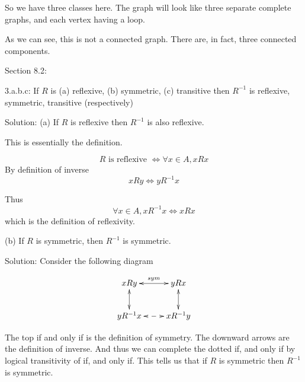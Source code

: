 \documentclass[16 pt]{amsart}
\theoremstyle{definition}
\theoremstyle{remark}
\numberwithin{equation}{section}
\begin{document}
So we have three classes here.  The graph will look like three separate complete graphs, and each vertex having a loop.

\vspace{.5in}


As we can see, this is not a connected graph.  There are, in fact, three connected components.


\newpage

Section 8.2:


3.a.b.c: If $R$ is (a) reflexive, (b) symmetric, (c) transitive then $R^{-1}$ is reflexive, symmetric, transitive (respectively)

\vspace{1in}

Solution:
(a) If $R$ is reflexive then $R^{-1}$ is also reflexive.

This is essentially the definition.

\[
R \text{ is reflexive }\iff \forall x\in A, xRx
\]
By definition of inverse
\[
xRy \iff yR^{-1}x
\]

Thus
\[
\forall x\in A, xR^{-1}x \iff xRx
\]
which is the definition of reflexivity.

\vspace{.5in}

(b) If $R$ is symmetric, then $R^{-1}$ is symmetric.

\vspace{.5in}

Solution: Consider the following diagram

\[
\xymatrix{
xRy \ar@{<->}[d] \ar@{<->}[r]^{sym} & yRx \ar@{<->}[d] \\
yR^{-1}x \ar@{<-->}[r] & xR^{-1}y
}
\]


The top if and only if is the definition of symmetry.  The downward arrows are the definition of inverse.  And thus we can complete the dotted if, and only if by logical transitivity of if, and only if. This tells us that if $R$ is symmetric then $R^{-1}$ is symmetric.
\end{document}
